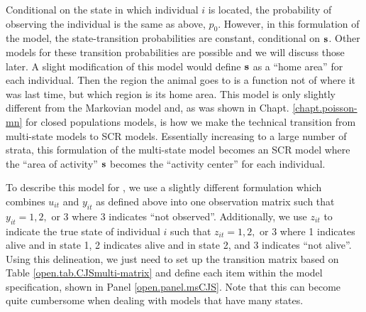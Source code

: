 Conditional on the state in which individual $i$ is located, the probability
of observing the individual is the same as above, $p_{0}$.  However, in this 
formulation of the model, the state-transition
probabilities are constant, conditional on ${\bf s}$.
Other models for these transition probabilities
are possible and we will discuss those later.
A slight modification of this model would define ${\bf s}$  as a
``home area'' 
for each individual. Then the region the animal goes to is a function
not of where it was last time, but which region is its home area.
This model is only slightly different from the Markovian model and, as
was shown in Chapt. \ref{chapt.poisson-mn} for closed populations
models, is how we make the technical transition from multi-state models
to SCR models.  Essentially increasing to a large number of strata,
this formulation of the multi-state model becomes an SCR model where
the ``area of activity'' ${\bf s}$ becomes the ``activity center'' for
each individual.

To describe this model for \jags, we use a slightly different
formulation which combines $u_{it}$ and $y_{it}$ as
defined above into one observation matrix such that $y_{it} = 1, 2,$
or $3$ where 3 indicates ``not observed''.  Additionally, we use
$z_{it}$ to indicate the true state of individual $i$ such that
$z_{it} = 1, 2,$ or $3$ where 1 indicates alive and in state 1, 2
indicates alive and in state 2, and 3 indicates ``not alive''.  Using
this delineation, we just need to set up the transition matrix based
on Table \ref{open.tab.CJSmulti-matrix} and define each item within
the model specification, shown in Panel \ref{open.panel.msCJS}.  Note
that this can become quite cumbersome when dealing with models that
have many states.


